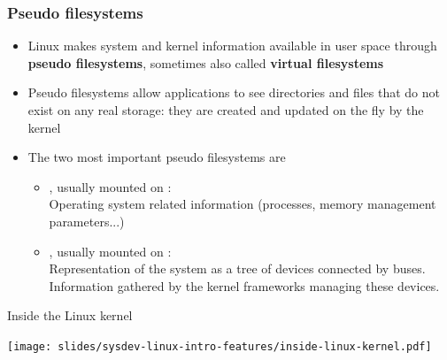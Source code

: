 \begin{frame}
  \frametitle{Pseudo filesystems}
  \begin{itemize}
  \item Linux makes system and kernel information available in user
    space through {\bf pseudo filesystems}, sometimes also called {\bf
      virtual filesystems}
  \item Pseudo filesystems allow applications to see directories and
    files that do not exist on any real storage: they are created and
    updated on the fly by the kernel
  \item The two most important pseudo filesystems are
    \begin{itemize}
    \item {}, usually mounted on : \\
      Operating system related information (processes, memory
      management parameters...)
    \item {}, usually mounted on : \\
       Representation of the system as a tree of
       devices connected by buses. Information
       gathered by the kernel frameworks managing these devices.
    \end{itemize}
  \end{itemize}
\end{frame}

\begin{frame}{Inside the Linux kernel}
  \begin{center}
    \texttt{[image: slides/sysdev-linux-intro-features/inside-linux-kernel.pdf]}
  \end{center}
\end{frame}


